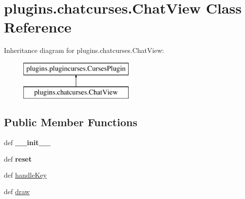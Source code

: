\hypertarget{classplugins_1_1chatcurses_1_1_chat_view}{\section{plugins.\-chatcurses.\-Chat\-View \-Class \-Reference}
\label{classplugins_1_1chatcurses_1_1_chat_view}
}
\-Inheritance diagram for plugins.\-chatcurses.\-Chat\-View\-:\begin{figure}[H]
\begin{center}
\leavevmode
\includegraphics[height=2.000000cm]{classplugins_1_1chatcurses_1_1_chat_view}
\end{center}
\end{figure}
\subsection*{\-Public \-Member \-Functions}
\begin{DoxyCompactItemize}
\item 
\hypertarget{classplugins_1_1chatcurses_1_1_chat_view_a24955bbd50c58d0dad24d710a564742e}{def {\bfseries \-\_\-\-\_\-init\-\_\-\-\_\-}}\label{classplugins_1_1chatcurses_1_1_chat_view_a24955bbd50c58d0dad24d710a564742e}

\item 
\hypertarget{classplugins_1_1chatcurses_1_1_chat_view_abdccabe6bc73dacc4e01354b992f4cf6}{def {\bfseries reset}}\label{classplugins_1_1chatcurses_1_1_chat_view_abdccabe6bc73dacc4e01354b992f4cf6}

\item 
def \hyperlink{classplugins_1_1chatcurses_1_1_chat_view_a96c4c19690f0c756a121226ce681eb03}{handle\-Key}
\item 
def \hyperlink{classplugins_1_1chatcurses_1_1_chat_view_a7f542a8a2cf51ecabf42f5da627e36c3}{draw}
\end{DoxyCompactItemize}
